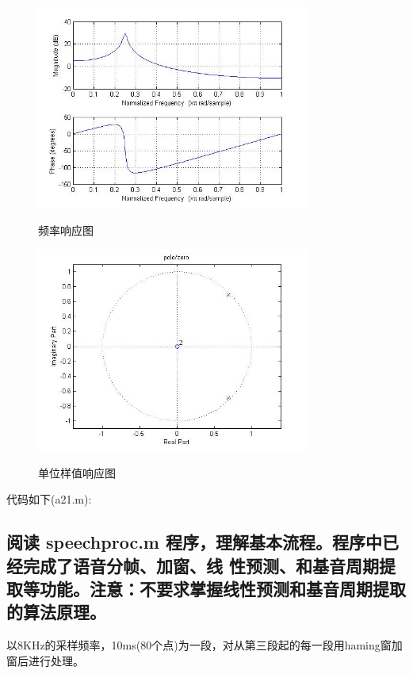 \documentclass{ctexart}
\begin{document}
\begin{figure}
    \centering
    \includegraphics[width=0.8\textwidth]{1_freqz.jpg}\\
    \caption{频率响应图\label{1freq}}
\end{figure}

\begin{figure}
    \centering
    \includegraphics[width=0.8\textwidth]{1_zp.jpg}\\
    \caption{单位样值响应图\label{1ir}}
\end{figure}

代码如下(a21.m):


\subsection{
    阅读 speechproc.m 程序，理解基本流程。程序中已经完成了语音分帧、加窗、线
    性预测、和基音周期提取等功能。注意：不要求掌握线性预测和基音周期提取的算法原理。
}

以8KHz的采样频率，10ms(80个点)为一段，对从第三段起的每一段用haming窗加窗后进行处理。
\end{document}
